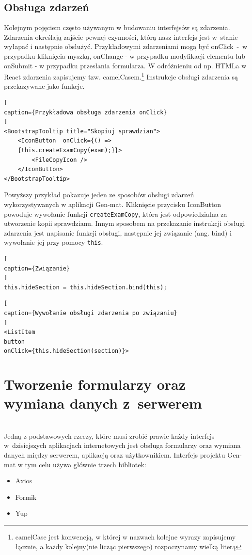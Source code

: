 \documentclass[oneside,polski,logo,indent]{amuthesis}
\begin{document}
\subsection{Obsługa zdarzeń}
{
Kolejnym pojęciem często używanym w budowaniu interfejsów są zdarzenia. Zdarzenia określają zajście pewnej czynności, którą nasz interfejs jest w~stanie wyłapać i następnie obsłużyć.
Przykładowymi zdarzeniami mogą być onClick~-~w przypadku kliknięcia myszką, onChange - w przypadku modyfikacji elementu lub onSubmit - w przypadku przesłania formularza.
W odróżnieniu od np. HTMLa w React zdarzenia zapisujemy tzw. camelCasem.\footnote{camelCase jest konwencją, w której w nazwach kolejne wyrazy zapisujemy łącznie, a każdy kolejny(nie licząc pierwszego) rozpoczynamy wielką literą}
Instrukcje obsługi zdarzenia są przekazywane jako funkcje.
\begin{lstlisting}[
caption={Przykładowa obsługa zdarzenia onClick}
]
<BootstrapTooltip title="Skopiuj sprawdzian">
	<IconButton  onClick={() => 
	{this.createExamCopy(exam);}}>
		<FileCopyIcon />
	</IconButton>
</BootstrapTooltip>
\end{lstlisting}
}
Powyższy przykład pokazuje jeden ze sposobów obsługi zdarzeń wykorzystywanych w aplikacji Gen-mat. Kliknięcie przycisku IconButton powoduje wywołanie funkcji \texttt{createExamCopy}, która jest odpowiedzialna za utworzenie kopii sprawdzianu.
Innym sposobem na przekazanie instrukcji obsługi zdarzenia jest napisanie funkcji obsługi, następnie jej związanie (ang. bind) i wywołanie jej przy pomocy \texttt{this}.
\begin{lstlisting}[
caption={Związanie}
]
this.hideSection = this.hideSection.bind(this);
\end{lstlisting}
\begin{lstlisting}[
caption={Wywołanie obsługi zdarzenia po związaniu}
]
<ListItem
button 
onClick={this.hideSection(section)}>
\end{lstlisting}
\section{Tworzenie formularzy oraz wymiana danych z~serwerem} \mbox{}\\
Jedną z podstawowych rzeczy, które musi zrobić prawie każdy interfejs w~dzisiejszych aplikacjach internetowych jest obsługa formularzy oraz wymiana danych między serwerem, aplikacją oraz użytkownikiem. Interfejs projektu Gen-mat w tym celu używa głównie trzech bibliotek:
\begin{itemize}
\item Axios
\item Formik
\item Yup
\end{itemize}
\end{document}
